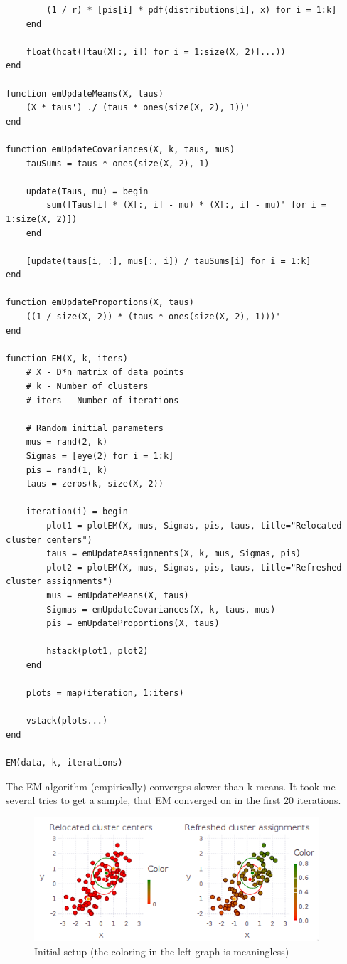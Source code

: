 \documentclass[10pt,a4paper]{article}
\begin{document}
\begin{verbatim}
        (1 / r) * [pis[i] * pdf(distributions[i], x) for i = 1:k]
    end

    float(hcat([tau(X[:, i]) for i = 1:size(X, 2)]...))
end

function emUpdateMeans(X, taus)
    (X * taus') ./ (taus * ones(size(X, 2), 1))'
end

function emUpdateCovariances(X, k, taus, mus)
    tauSums = taus * ones(size(X, 2), 1)

    update(Taus, mu) = begin
        sum([Taus[i] * (X[:, i] - mu) * (X[:, i] - mu)' for i = 1:size(X, 2)])
    end

    [update(taus[i, :], mus[:, i]) / tauSums[i] for i = 1:k]
end

function emUpdateProportions(X, taus)
    ((1 / size(X, 2)) * (taus * ones(size(X, 2), 1)))'
end

function EM(X, k, iters)
    # X - D*n matrix of data points
    # k - Number of clusters
    # iters - Number of iterations

    # Random initial parameters
    mus = rand(2, k)
    Sigmas = [eye(2) for i = 1:k]
    pis = rand(1, k)
    taus = zeros(k, size(X, 2))

    iteration(i) = begin
        plot1 = plotEM(X, mus, Sigmas, pis, taus, title="Relocated cluster centers")
        taus = emUpdateAssignments(X, k, mus, Sigmas, pis)
        plot2 = plotEM(X, mus, Sigmas, pis, taus, title="Refreshed cluster assignments")
        mus = emUpdateMeans(X, taus)
        Sigmas = emUpdateCovariances(X, k, taus, mus)
        pis = emUpdateProportions(X, taus)

        hstack(plot1, plot2)
    end

    plots = map(iteration, 1:iters)

    vstack(plots...)
end

EM(data, k, iterations)
\end{verbatim}
The EM algorithm (empirically) converges slower than k-means. It took me several
tries to get a sample, that EM converged on in the first 20 iterations.
\begin{figure}[ht]
  \centering
  \includegraphics[width=300pt]{8_3_1}
  \caption{Initial setup (the coloring in the left graph is meaningless)}
\end{figure}
\end{document}
